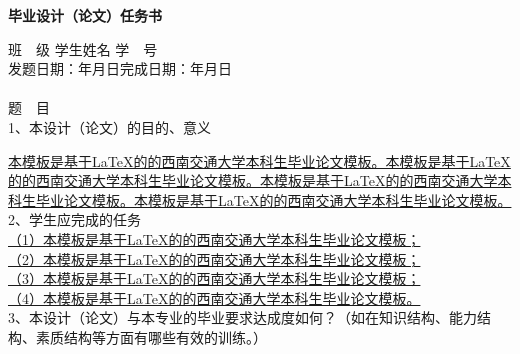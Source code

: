 






\vspace*{0.5cm}
\begin{center}{\hei {} \textbf{毕业设计（论文）任务书}}\end{center}
\vspace{1cm}

\hspace{-0.85cm}班\ \ 级\underline{}
学生姓名\underline{}
学\ \ 号\underline{}
\\发题日期：\hspace{2cm}年\hspace{1cm}月\hspace{1cm}日\hfill 完成日期：\hspace{2cm}年\hspace{1cm}月\hspace{1cm}日
\\
\\题\ \ 目\underline{}
\\1、本设计（论文）的目的、意义

\uline{本模板是基于LaTeX的的西南交通大学本科生毕业论文模板。本模板是基于LaTeX的的西南交通大学本科生毕业论文模板。本模板是基于LaTeX的的西南交通大学本科生毕业论文模板。本模板是基于LaTeX的的西南交通大学本科生毕业论文模板。}
\\2、学生应完成的任务\\
\noindent
\uline{（1）本模板是基于LaTeX的的西南交通大学本科生毕业论文模板；\\
    （2）本模板是基于LaTeX的的西南交通大学本科生毕业论文模板；\\
    （3）本模板是基于LaTeX的的西南交通大学本科生毕业论文模板；\\
    （4）本模板是基于LaTeX的的西南交通大学本科生毕业论文模板。}
\\3、本设计（论文）与本专业的毕业要求达成度如何？（如在知识结构、能力结构、素质结构等方面有哪些有效的训练。）

